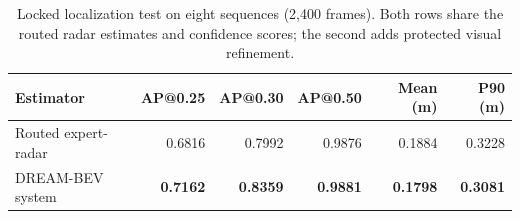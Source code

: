 \begin{table}[t]
\centering\small
\caption{Locked localization test on eight sequences (2,400 frames). Both rows share the routed radar estimates and confidence scores; the second adds protected visual refinement.}
\label{tab:test}
\begin{tabular*}{\textwidth}{@{\extracolsep{\fill}}lrrrrr@{}}
\toprule
Estimator & AP@0.25 & AP@0.30 & AP@0.50 & Mean (m) & P90 (m)\\
\midrule
Routed expert-radar &0.6816&0.7992&0.9876&0.1884&0.3228\\
DREAM-BEV system &\textbf{0.7162}&\textbf{0.8359}&\textbf{0.9881}&\textbf{0.1798}&\textbf{0.3081}\\
\bottomrule
\end{tabular*}
\end{table}
